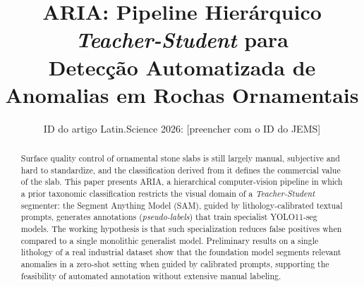 \documentclass[10pt,conference]{IEEEtran}
\begin{document}
\title{ARIA: Pipeline Hierárquico \textit{Teacher-Student} para\\
Detecção Automatizada de Anomalias em Rochas Ornamentais}

\newif\iffinal
\finalfalse
\newcommand{\blind}[2]{\iffinal#2\else#1\fi}
\newcommand{\cmtid}{[preencher com o ID do JEMS]}

\iffinal
\author{
\IEEEauthorblockN{Henrique Machado de Oliveira}
\IEEEauthorblockA{Instituto Federal do Espírito Santo\\
Cachoeiro de Itapemirim, Brasil\\
rikemachado999@gmail.com}
\and
\IEEEauthorblockN{[Nome do orientador]}
\IEEEauthorblockA{Instituto Federal do Espírito Santo\\
Cachoeiro de Itapemirim, Brasil\\
[e-mail]}}
\else
  \author{ID do artigo Latin.Science 2026: \cmtid \\ }
\fi

\maketitle
\thispagestyle{fancy}

\renewcommand{\abstractname}{Abstract}
\begin{abstract}
Surface quality control of ornamental stone slabs is still largely manual, subjective and hard to standardize, and the classification derived from it defines the commercial value of the slab. This paper presents ARIA, a hierarchical computer-vision pipeline in which a prior taxonomic classification restricts the visual domain of a \textit{Teacher-Student} segmenter: the Segment Anything Model (SAM), guided by lithology-calibrated textual prompts, generates annotations (\textit{pseudo-labels}) that train specialist YOLO11-seg models. The working hypothesis is that such specialization reduces false positives when compared to a single monolithic generalist model. Preliminary results on a single lithology of a real industrial dataset show that the foundation model segments relevant anomalies in a zero-shot setting when guided by calibrated prompts, supporting the feasibility of automated annotation without extensive manual labeling.
\end{abstract}
\end{document}
